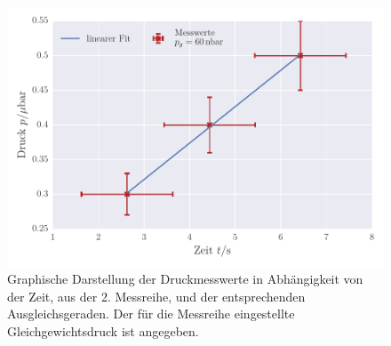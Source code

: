 \begin{figure}[!h]
 \centering
 \includegraphics[scale=0.9]{../Grafiken/Leckrate_Turbo_1.pdf}	
 \caption{Graphische Darstellung der Druckmesswerte in Abhängigkeit von der Zeit, aus der 2. Messreihe, und der
 	entsprechenden Ausgleichsgeraden. Der für die Messreihe eingestellte Gleichgewichtsdruck ist angegeben. \label{fig:leckrate_turbo_1}}
 \end{figure} 